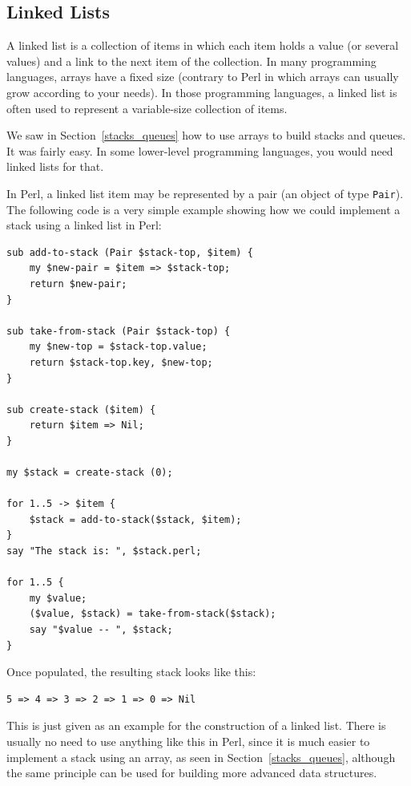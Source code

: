 \subsection{Linked Lists}
\label{linked_list}

A linked list is a collection of items in which each item holds 
a value (or several values) and a link to the next item of the 
collection. In many programming languages, arrays have a fixed 
size (contrary to Perl in which arrays can usually grow according to 
your needs). In those programming languages, a linked list 
is often used to represent a variable-size collection of items.

We saw in Section~\ref{stacks_queues} how to use arrays 
to build stacks and queues. It was fairly easy. In some 
lower-level programming languages, you would need linked 
lists for that.

In Perl, a linked list item may be represented by a pair 
(an object of type \verb'Pair'). The 
following code is a very simple example showing how 
we could implement a stack using a linked list in Perl:

\begin{verbatim}
sub add-to-stack (Pair $stack-top, $item) {
    my $new-pair = $item => $stack-top;
    return $new-pair;
}

sub take-from-stack (Pair $stack-top) {
    my $new-top = $stack-top.value;
    return $stack-top.key, $new-top;
}

sub create-stack ($item) {
    return $item => Nil;
}

my $stack = create-stack (0);

for 1..5 -> $item {
    $stack = add-to-stack($stack, $item);
}
say "The stack is: ", $stack.perl;

for 1..5 {
    my $value;
    ($value, $stack) = take-from-stack($stack);
    say "$value -- ", $stack;    
}
\end{verbatim}

Once populated, the resulting stack looks like this:

\begin{verbatim}
5 => 4 => 3 => 2 => 1 => 0 => Nil
\end{verbatim}

This is just given as an example for the construction of a 
linked list. There is usually no need to use anything like 
this in Perl, since it is much easier to implement 
a stack using an array, as seen in Section~\ref{stacks_queues}, 
although the same principle can be used for building more 
advanced data structures.

